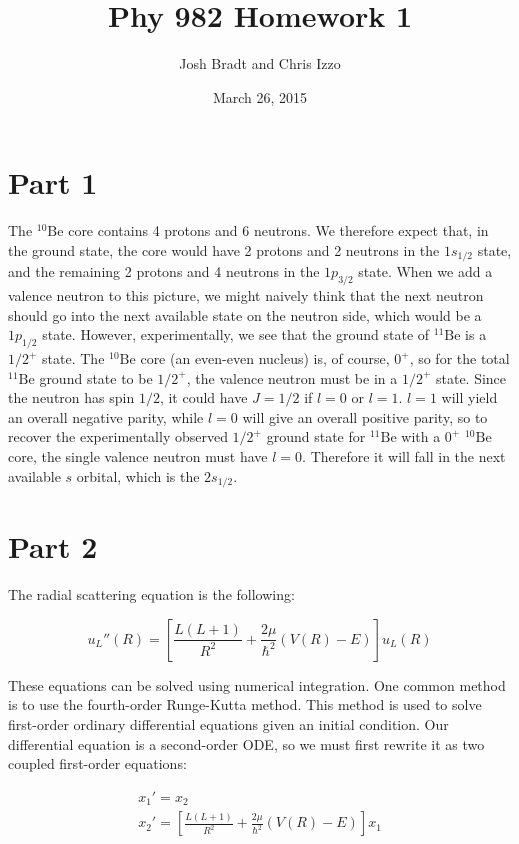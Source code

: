\documentclass{article}
\title{Phy 982 Homework 1}
\author{Josh Bradt and Chris Izzo}
\date{March 26, 2015}
\newcommand{\nuc}[2]{${}^{#1}\text{#2}$}
\begin{document}
\maketitle

\section*{Part 1}


The \nuc{10}{Be} core contains 4 protons and 6 neutrons.  We therefore expect that, in the ground state, the core would have 2 protons and 2 neutrons in the $1s_{1/2}$ state, and the remaining 2 protons and 4 neutrons in the $1p_{3/2}$ state.  When we add a valence neutron to this picture, we might naively think that the next neutron should go into the next available state on the neutron side, which would be a $1p_{1/2}$ state.  However, experimentally, we see that the ground state of \nuc{11}{Be} is a $1/2^+$ state.  The \nuc{10}{Be} core (an even-even nucleus) is, of course, $0^+$, so for the total \nuc{11}{Be} ground state to be $1/2^+$, the valence neutron must be in a $1/2^+$ state.  Since the neutron has spin $1/2$, it could have $J=1/2$ if $l=0$ or $l=1$.  $l=1$ will yield an overall negative parity, while $l=0$ will give an overall positive parity, so to recover the experimentally observed $1/2^+$ ground state for \nuc{11}{Be} with a $0^+$ \nuc{10}{Be} core, the single valence neutron must have $l=0$. Therefore it will fall in the next available $s$ orbital, which is the $2s_{1/2}$.

\section*{Part 2}

The radial scattering equation is the following:
	
\begin{equation}
	u_L''(R) = \left[ \frac{L(L+1)}{R^2} + \frac{2\mu}{\hbar^2} (V(R) - E) \right] u_L(R)
\end{equation}

These equations can be solved using numerical integration. One common method is to use the fourth-order Runge-Kutta method. This method is used to solve first-order ordinary differential equations given an initial condition. Our differential equation is a second-order ODE, so we must first rewrite it as two coupled first-order equations:

\begin{gather}
	x_1' = x_2 \\
	x_2' = \left[ \frac{L(L+1)}{R^2} + \frac{2\mu}{\hbar^2} (V(R) - E) \right] x_1
\end{gather}
\end{document}
